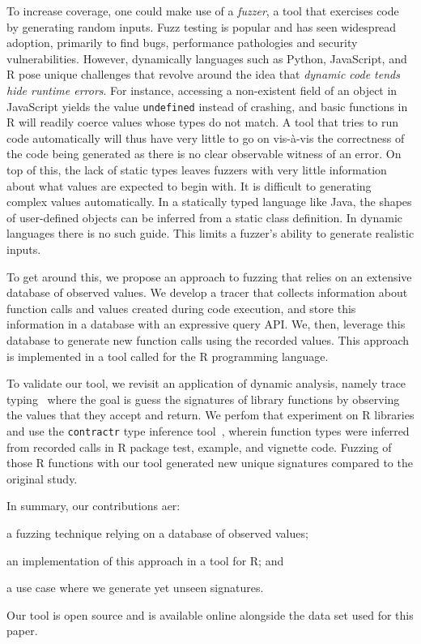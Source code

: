 \documentclass[sigplan,nonacm,anonymous,review]{acmart}
\begin{document}
To increase coverage, one could make use of a \textit{fuzzer}, a tool
that exercises code by generating random inputs.  Fuzz testing is
popular and has seen widespread adoption, primarily to find bugs,
performance pathologies and security vulnerabilities.  However,
dynamically languages such as Python, JavaScript, and R pose unique
challenges that revolve around the idea that \textit{dynamic code
  tends hide runtime errors}.  For instance, accessing a non-existent
field of an object in JavaScript yields the value {\tt undefined}
instead of crashing, and basic functions in R will readily coerce
values whose types do not match.  A tool that tries to run code
automatically will thus have very little to go on vis-\`a-vis the
correctness of the code being generated as there is no clear
observable witness of an error. On top of this, the lack of static
types leaves fuzzers with very little information about what values
are expected to begin with.  It is difficult to generating complex
values automatically.  In a statically typed language like Java, the
shapes of user-defined objects can be inferred from a static class
definition. In dynamic languages there is no such guide.  This limits
a fuzzer's ability to generate realistic inputs.

To get around this, we propose an approach to fuzzing that relies on
an extensive database of observed values.  We develop a tracer that
collects information about function calls and values created during
code execution, and store this information in a database with an
expressive query API.  We, then, leverage this database to generate
new function calls using the recorded values.  This approach is
implemented in a tool called \tool for the R programming language.

To validate our tool, we revisit an application of dynamic analysis,
namely trace typing~\cite{andreasen2016trace} where the goal is guess
the signatures of library functions by observing the values that they
accept and return. We perfom that experiment on R libraries and use
the {\tt contractr} type inference tool~\cite{turcotte2020designing},
wherein function types were inferred from recorded calls in R package
test, example, and vignette code.  Fuzzing \UFNumFunctions of those R
functions with our tool generated \UFSignatrSignaturesRnd new unique
signatures compared to the original study.

In summary, our contributions aer:
\begin{inparaenum}[(1)]
\item a fuzzing technique relying on a database of observed values;
\item an implementation of this approach in a tool for R; and
\item a use case where we generate yet unseen signatures.
\end{inparaenum} 
Our tool is open source and is available online alongside the data set
used for this paper.
\end{document}
